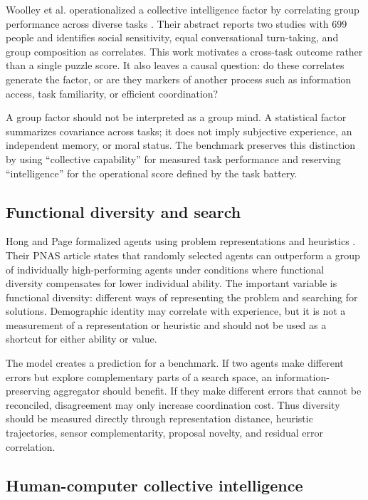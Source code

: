 \documentclass[conference]{IEEEtran}
\begin{document}
Woolley et al. operationalized a collective intelligence factor by correlating group performance across diverse tasks \cite{woolley2010}. Their abstract reports two studies with 699 people and identifies social sensitivity, equal conversational turn-taking, and group composition as correlates. This work motivates a cross-task outcome rather than a single puzzle score. It also leaves a causal question: do these correlates generate the factor, or are they markers of another process such as information access, task familiarity, or efficient coordination?

A group factor should not be interpreted as a group mind. A statistical factor summarizes covariance across tasks; it does not imply subjective experience, an independent memory, or moral status. The benchmark preserves this distinction by using ``collective capability'' for measured task performance and reserving ``intelligence'' for the operational score defined by the task battery.

\subsection{Functional diversity and search}

Hong and Page formalized agents using problem representations and heuristics \cite{hongpage2004}. Their PNAS article states that randomly selected agents can outperform a group of individually high-performing agents under conditions where functional diversity compensates for lower individual ability. The important variable is functional diversity: different ways of representing the problem and searching for solutions. Demographic identity may correlate with experience, but it is not a measurement of a representation or heuristic and should not be used as a shortcut for either ability or value.

The model creates a prediction for a benchmark. If two agents make different errors but explore complementary parts of a search space, an information-preserving aggregator should benefit. If they make different errors that cannot be reconciled, disagreement may only increase coordination cost. Thus diversity should be measured directly through representation distance, heuristic trajectories, sensor complementarity, proposal novelty, and residual error correlation.

\subsection{Human-computer collective intelligence}
\end{document}
